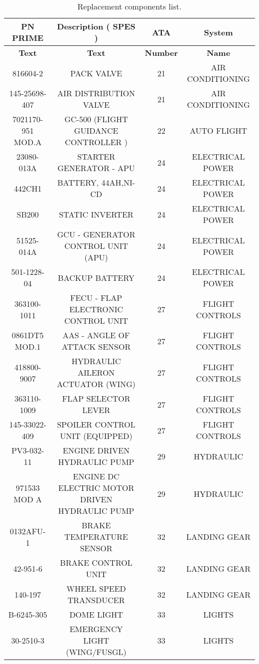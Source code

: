 \begin{table}[htbp]
  \centering
  \caption{Replacement components list.}
    \begin{tabular}{cccc}
    \toprule
    \textbf{PN PRIME} & \textbf{Description ( SPES )} & \textbf{ATA} & \textbf{System} \\
    \midrule
    \textbf{Text} & \textbf{Text} & \textbf{Number} & \textbf{Name} \\
    816604-2 & PACK VALVE & 21    & AIR CONDITIONING \\
    145-25698-407 & AIR DISTRIBUTION VALVE & 21    & AIR CONDITIONING \\
    7021170-951 MOD.A & GC-500 (FLIGHT GUIDANCE CONTROLLER ) & 22    & AUTO FLIGHT \\
    23080-013A & STARTER GENERATOR - APU & 24    & ELECTRICAL POWER \\
    442CH1 & BATTERY, 44AH,NI-CD & 24    & ELECTRICAL POWER \\
    SB200 & STATIC INVERTER & 24    & ELECTRICAL POWER \\
    51525-014A & GCU - GENERATOR CONTROL UNIT (APU) & 24    & ELECTRICAL POWER \\
    501-1228-04 & BACKUP BATTERY & 24    & ELECTRICAL POWER \\
    363100-1011 & FECU - FLAP ELECTRONIC CONTROL UNIT & 27    & FLIGHT CONTROLS \\
    0861DT5 MOD.1 & AAS - ANGLE OF ATTACK SENSOR & 27    & FLIGHT CONTROLS \\
    418800-9007 & HYDRAULIC AILERON ACTUATOR (WING) & 27    & FLIGHT CONTROLS \\
    363110-1009 & FLAP SELECTOR LEVER & 27    & FLIGHT CONTROLS \\
    145-33022-409 & SPOILER CONTROL UNIT (EQUIPPED) & 27    & FLIGHT CONTROLS \\
    PV3-032-11 & ENGINE DRIVEN HYDRAULIC PUMP & 29    & HYDRAULIC \\
    971533 MOD A & ENGINE DC ELECTRIC MOTOR DRIVEN HYDRAULIC PUMP & 29    & HYDRAULIC \\
    0132AFU-1 & BRAKE TEMPERATURE SENSOR & 32    & LANDING GEAR \\
    42-951-6 & BRAKE CONTROL UNIT  & 32    & LANDING GEAR \\
    140-197 & WHEEL SPEED TRANSDUCER  & 32    & LANDING GEAR \\
    B-6245-305 & DOME LIGHT & 33    & LIGHTS \\
    30-2510-3 & EMERGENCY LIGHT (WING/FUSGL) & 33    & LIGHTS \\

\end{tabular}
\end{table}

